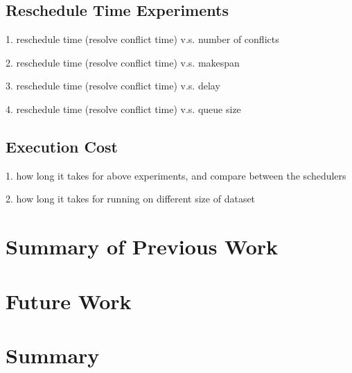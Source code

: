 \documentclass[letterpaper, 10 pt, conference]{ieeeconf}
\begin{document}
\subsection{Reschedule Time Experiments}

1. reschedule time (resolve conflict time) v.s. number of conflicts

2. reschedule time (resolve conflict time) v.s. makespan

3. reschedule time (resolve conflict time) v.s. delay

4. reschedule time (resolve conflict time) v.s. queue size

\subsection{Execution Cost}

1. how long it takes for above experiments, and compare between the schedulers

2. how long it takes for running on different size of dataset

\section{Summary of Previous Work}

\section{Future Work}
\section{Summary}


\end{document}
